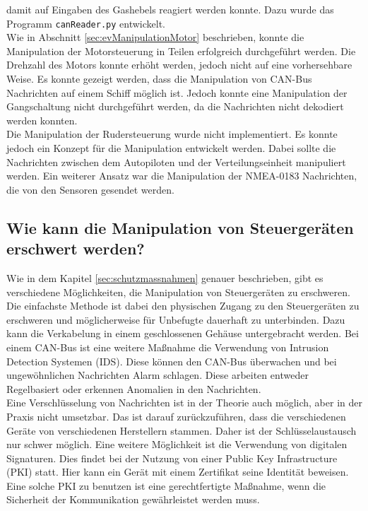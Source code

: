 damit auf Eingaben des Gashebels reagiert werden konnte. Dazu wurde das Programm \texttt{canReader.py} entwickelt.
\\
Wie in Abschnitt \ref{sec:evManipulationMotor} beschrieben, konnte die Manipulation der Motorsteuerung in Teilen 
erfolgreich durchgeführt werden. Die Drehzahl des Motors konnte erhöht werden, jedoch nicht auf eine vorhersehbare Weise.
Es konnte gezeigt werden, dass die Manipulation von CAN-Bus Nachrichten auf einem Schiff möglich ist.
Jedoch konnte eine Manipulation der Gangschaltung nicht durchgeführt werden, da die Nachrichten nicht dekodiert werden konnten.\\
Die Manipulation der Rudersteuerung wurde nicht implementiert. Es konnte jedoch ein Konzept für die Manipulation
entwickelt werden. Dabei sollte die Nachrichten zwischen dem Autopiloten und der Verteilungseinheit manipuliert werden.
Ein weiterer Ansatz war die Manipulation der NMEA-0183 Nachrichten, die von den Sensoren gesendet werden.


\subsection{Wie kann die Manipulation von Steuergeräten erschwert werden?}
Wie in dem Kapitel \ref{sec:schutzmassnahmen} genauer beschrieben, gibt es verschiedene Möglichkeiten, die Manipulation von Steuergeräten zu erschweren.
Die einfachste Methode ist dabei den physischen Zugang zu den Steuergeräten zu erschweren und möglicherweise für Unbefugte dauerhaft zu unterbinden.
Dazu kann die Verkabelung in einem geschlossenen Gehäuse untergebracht werden. 
Bei einem CAN-Bus ist eine weitere Maßnahme die Verwendung von Intrusion Detection Systemen (IDS).
Diese können den CAN-Bus überwachen und bei ungewöhnlichen Nachrichten Alarm schlagen. Diese arbeiten entweder Regelbasiert oder erkennen Anomalien in den Nachrichten.
\\
Eine Verschlüsselung von Nachrichten ist in der Theorie auch möglich, aber in der Praxis nicht umsetzbar. Das ist darauf zurückzuführen, dass die verschiedenen
Geräte von verschiedenen Herstellern stammen. Daher ist der Schlüsselaustausch nur schwer möglich. Eine weitere Möglichkeit ist die Verwendung von digitalen Signaturen.
Dies findet bei der Nutzung von einer Public Key Infrastructure (PKI) statt. Hier kann ein Gerät mit einem Zertifikat seine Identität beweisen. 
Eine solche PKI zu benutzen ist eine gerechtfertigte Maßnahme, wenn die Sicherheit der Kommunikation gewährleistet werden muss. \\

